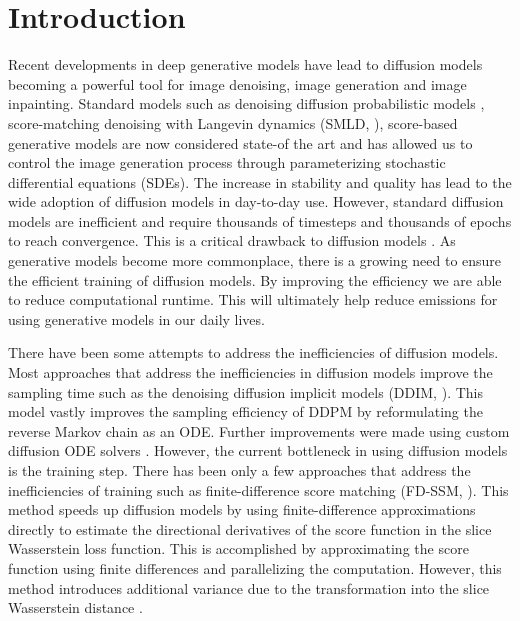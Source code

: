 \documentclass[]{interact}
\theoremstyle{plain}%
\theoremstyle{definition}
\theoremstyle{remark}
\begin{document}
\section{Introduction}
Recent developments in deep generative models have lead to diffusion models becoming a powerful tool for image denoising, image generation and image inpainting. Standard models such as denoising diffusion probabilistic models \cite{ho-2020}, score-matching denoising with Langevin dynamics (SMLD, \cite{ysong-2019}), score-based generative models \cite{ysong-2020} are now considered state-of the art and has allowed us to control the image generation process through parameterizing stochastic differential equations (SDEs). The increase in stability and quality has lead to the wide adoption of diffusion models in day-to-day use. However, standard diffusion models are inefficient and require thousands of timesteps and thousands of epochs to reach convergence. This is a critical drawback to diffusion models \cite{ysong-2019}. As generative models become more commonplace, there is a growing need to ensure the efficient training of diffusion models. By improving the efficiency we are able to reduce computational runtime. This will ultimately help reduce emissions for using generative models in our daily lives. 

There have been some attempts to address the inefficiencies of diffusion models. Most approaches that address the inefficiencies in diffusion models improve the sampling time such as the denoising diffusion implicit models (DDIM, \cite{jsong-2020}). This model vastly improves the sampling efficiency of DDPM by reformulating the reverse Markov chain as an ODE. Further improvements were made using custom diffusion ODE solvers \cite{lu-2022}. However, the current bottleneck in using diffusion models is the training step. There has been only a few approaches that address the inefficiencies of training such as finite-difference score matching (FD-SSM, \cite{pang-2020}). This method speeds up diffusion models by using finite-difference approximations directly to estimate the directional derivatives of the score function in the slice Wasserstein loss function. This is accomplished by approximating the score function using finite differences and parallelizing the computation. However, this method introduces additional variance due to the transformation into the slice Wasserstein distance \cite{pang-2020}. 
\end{document}
